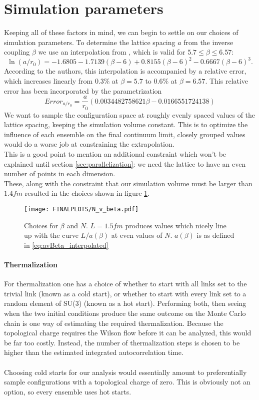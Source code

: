 \documentclass[a4paper,10pt]{book}
\begin{document}
\section{Simulation parameters}
Keeping all of these factors in mind, we can begin to settle on our choices of simulation parameters.
To determine the lattice spacing $a$ from the inverse coupling $\beta$ we use an interpolation from \cite{Guagnelli_1998}, which is valid for $5.7 \leq \beta \leq 6.57$:
\begin{equation}\label{eq:avBeta_interpolated}
\ln \left(a / r_{0}\right)=-1.6805-1.7139(\beta-6)+0.8155(\beta-6)^{2}-0.6667(\beta-6)^{3}.
\end{equation}
According to the authors, this interpolation is accompanied by a relative error, which increases linearly from $0.3\%$ at $\beta = 5.7$ to $0.6\%$ at $\beta = 6.57$. This relative error has been incorporated by the parametrization 
\begin{equation}
Error_{a/r_0} = \frac{a}{r_0}(0.0034482758621\beta - 0.0166551724138)
\end{equation}
We want to sample the configuration space at roughly evenly spaced values of the lattice spacing, keeping the simulation volume constant. This is to optimize the influence of each ensemble on the final continuum limit, closely grouped values would do a worse job at constraining the extrapolation.\\This is a good point to mention an additional constraint which won't be explained until section \ref{sec:parallelization}: we need the lattice to have an even number of points in each dimension.\\These, along with the constraint that our simulation volume must be larger than $1.4fm$ resulted in the choices shown in figure \ref{fig:choosingBetasAndLambdas}.
\begin{figure}
\centering
\texttt{[image: FINALPLOTS/N\_v\_beta.pdf]}
\caption[Choice of $\beta$ and lattice volume]{Choices for $\beta$ and $N$. $L=1.5fm$ produces values which nicely line up with the curve $L/a(\beta)$ at even values of $N$. $a(\beta)$ is as defined in \eqref{eq:avBeta_interpolated}}\label{fig:choosingBetasAndLambdas}
\end{figure}
\paragraph{Thermalization}
For thermalization one has a choice of whether to start with all links set to the trivial link (known as a cold start), or whether to start with every link set to a random element of SU(3) (known as a hot start). Performing both, then seeing when the two initial conditions produce the same outcome on the Monte Carlo chain is one way of estimating the required thermalization. Because the topological charge requires the Wilson flow before it can be analyzed, this would be far too costly. Instead, the number of thermalization steps is chosen to be higher than the estimated integrated autocorrelation time.\\\\Choosing cold starts for our analysis would essentially amount to preferentially sample configurations with a topological charge of zero. This is obviously not an option, so every ensemble uses hot starts.
\end{document}
